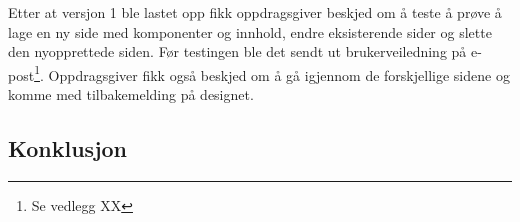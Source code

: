 Etter at versjon 1 ble lastet opp fikk oppdragsgiver beskjed om å teste å prøve å lage en ny side med komponenter og innhold, endre eksisterende sider og slette den nyopprettede siden. Før testingen ble det sendt ut brukerveiledning på e-post\footnote{Se vedlegg XX}. Oppdragsgiver fikk også beskjed om å gå igjennom de forskjellige sidene og komme med tilbakemelding på designet. 

\subsection{Konklusjon}






